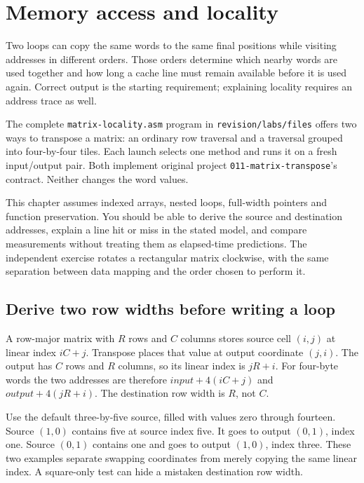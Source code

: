 \chapter{Memory access and locality}
\label{revision:locality}

Two loops can copy the same words to the same final positions while visiting
addresses in different orders. Those orders determine which nearby words are
used together and how long a cache line must remain available before it is used
again. Correct output is the starting requirement; explaining locality requires
an address trace as well.

The complete \texttt{matrix-locality.asm} program in \texttt{revision/labs/files}
offers two ways to transpose a matrix: an ordinary row traversal and
a traversal grouped into four-by-four tiles. Each launch selects one method and
runs it on a fresh input/output pair. Both implement original project
\texttt{011-matrix-transpose}'s contract. Neither changes the word values.

This chapter assumes indexed arrays, nested loops, full-width pointers and
function preservation. You should be able to derive the source and destination
addresses, explain a line hit or miss in the stated model, and compare measurements
without treating them as elapsed-time predictions. The independent exercise rotates
a rectangular matrix clockwise, with the same separation between data mapping
and the order chosen to perform it.

\section{Derive two row widths before writing a loop}

A row-major matrix with $R$ rows and $C$ columns stores source cell $(i,j)$ at
linear index $iC+j$. Transpose places that value at output coordinate $(j,i)$.
The output has $C$ rows and $R$ columns, so its linear index is $jR+i$.
For four-byte words the two addresses are therefore
$input+4(iC+j)$ and $output+4(jR+i)$. The destination row width is $R$, not $C$.

Use the default three-by-five source, filled with values zero through fourteen.
Source $(1,0)$ contains five at source index five. It goes to output $(0,1)$,
index one. Source $(0,1)$ contains one and goes to output $(1,0)$, index three.
These two examples separate swapping coordinates from merely copying the same
linear index. A square-only test can hide a mistaken destination row width.

